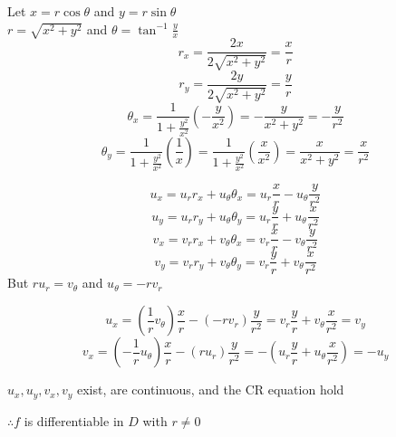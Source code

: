 \documentclass[letterpaper,12pt,fleqn]{article}
\renewcommand{\o}{\theta}
\begin{document}
\begin{theproof}
  Let $x=r\cos\o$ and $y=r\sin\o$ \\
  $r=\sqrt{x^2+y^2}$ and $\o=\tan^{-1}\frac{y}{x}$
  \[r_x=\frac{2x}{2\sqrt{x^2+y^2}}=\frac{x}{r}\]
  \[r_y=\frac{2y}{2\sqrt{x^2+y^2}}=\frac{y}{r}\]
  \[\o_x=\frac{1}{1+\frac{y^2}{x^2}}\left(-\frac{y}{x^2}\right)=
  -\frac{y}{x^2+y^2}=-\frac{y}{r^2}\]
  \[\o_y=\frac{1}{1+\frac{y^2}{x^2}}\left(\frac{1}{x}\right)=
  \frac{1}{1+\frac{y^2}{x^2}}\left(\frac{x}{x^2}\right)=
  \frac{x}{x^2+y^2}=\frac{x}{r^2}\]

  \[u_x=u_rr_x+u_{\o}\o_x=u_r\frac{x}{r}-u_{\o}\frac{y}{r^2}\]
  \[u_y=u_rr_y+u_{\o}\o_y=u_r\frac{y}{r}+u_{\o}\frac{x}{r^2}\]
  \[v_x=v_rr_x+v_{\o}\o_x=v_r\frac{x}{r}-v_{\o}\frac{y}{r^2}\]
  \[v_y=v_rr_y+v_{\o}\o_y=v_r\frac{y}{r}+v_{\o}\frac{x}{r^2}\]
\newpage
  But $ru_r=v_{\o}$ and $u_{\o}=-rv_r$

  \[u_x=\left(\frac{1}{r}v_{\o}\right)\frac{x}{r}-(-rv_r)\frac{y}{r^2}=
  v_r\frac{y}{r}+v_{\o}\frac{x}{r^2}=v_y\]
  \[v_x=\left(-\frac{1}{r}u_{\o}\right)\frac{x}{r}-(ru_r)\frac{y}{r^2}=
  -\left(u_r\frac{y}{r}+u_{\o}\frac{x}{r^2}\right)=-u_y\]

  $u_x,u_y,v_x,v_y$ exist, are continuous, and the CR equation hold
  
  $\therefore f$ is differentiable in $D$ with $r\ne0$
\end{theproof}
\end{document}
